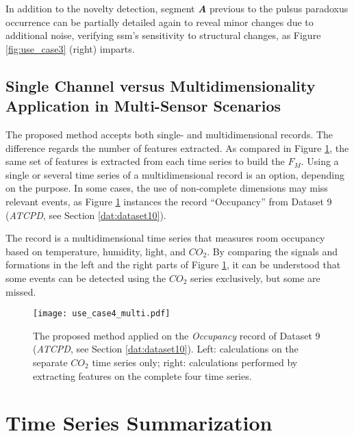 In addition to the novelty detection, segment \textbf{\textit{A}} previous to the pulsus paradoxus occurrence can be partially detailed again to reveal minor changes due to additional noise, verifying \gls{ssm}'s sensitivity to structural changes, as Figure \ref{fig:use_case3} (right) imparts.

\subsection{Single Channel versus Multidimensionality Application in Multi-Sensor Scenarios}
\label{sec:multi_example}

The proposed method accepts both single- and multidimensional records. The difference regards the number of features extracted. As compared in Figure \ref{fig:use_case4}, the same set of features is extracted from each time series to build the $F_M$.
Using a single or several time series of a multidimensional record is an option, depending on the purpose. In some cases, the use of non-complete dimensions may miss relevant events, as Figure \ref{fig:use_case4} instances the record ``Occupancy'' from Dataset 9 (\textit{ATCPD}, see Section \ref{dat:dataset10}). 

The record is a multidimensional time series that measures room occupancy based on temperature, humidity, light, and $CO_2$. By comparing the signals and formations in the left and the right parts of Figure \ref{fig:use_case4}, it can be understood that some events can be detected using the $CO_2$ series exclusively, but some are missed.

\begin{figure}
    \centering
    \texttt{[image: use\_case4\_multi.pdf]}
    \caption{The proposed method applied on the \textit{Occupancy} record of Dataset 9 (\textit{ATCPD}, see Section \ref{dat:dataset10}). Left: calculations on the separate $CO_2$ time series only; right: calculations performed by extracting features on the complete four time series.}
    \label{fig:use_case4}
\end{figure}

\section{Time Series Summarization}

